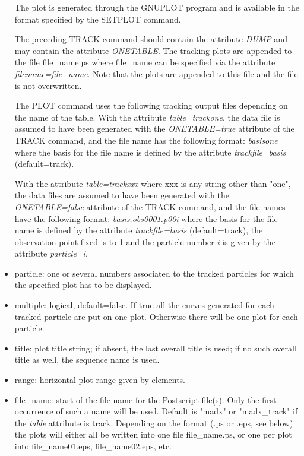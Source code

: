 \begin{itemize}
     The plot is generated through the GNUPLOT program and is available
     in the format specified by the SETPLOT command. 

     The preceding TRACK command should contain the attribute \textit{DUMP}
     and may contain the attribute \textit{ONETABLE}. The tracking plots
     are appended to the file file\_name.ps where file\_name can be
     specified via the attribute \textit{filename=file\_name}. Note that
     the plots are appended to this file and the file is not
     overwritten. 

     The PLOT command uses the following tracking output files depending on
     the name of the table.  
     With the attribute \textit{table=trackone}, the data file is assumed
     to have been generated with the \textit{ONETABLE=true} attribute of
     the TRACK command, and the file name has the following format: 
     \textit{basisone} where the basis for the file name is defined by the
     attribute \textit{trackfile=basis} (default=track).

     With the attribute \textit{table=trackxxx} where xxx is any string
     other than "one", the data files are assumed to have been generated
     with the \textit{ONETABLE=false} attribute of the TRACK command, and
     the file names have the following format: \textit{basis.obs0001.p00i}
     where the basis for the file name is defined by the attribute
     \textit{trackfile=basis} (default=track), the observation point fixed
     is to 1 and the particle number \textit{i} is given by the attribute
     \textit{particle=i}. 
 
   \item particle: one or several numbers associated to the tracked
     particles for which the specified plot has to be displayed.  

   \item multiple: logical, default=false. If true all the curves
     generated for each tracked particle are put on one plot. Otherwise
     there will be one plot for each particle.   

   \item title: plot title string; if absent, the last overall title is
     used; if no such overall title as well, the sequence name is used.   

   \item range: horizontal plot
     \href{../Introduction/ranges.html}{range} given by elements.  

   \item file\_name: start of the file name for the Postscript
     file(s). Only the first occurrence of such a name will be
     used. Default is "madx" or "madx\_track" if the \textit{table}
     attribute is track.  Depending on the format (.ps or .eps, see
     below) the plots will either all be written into one file
     file\_name.ps, or one per plot into file\_name01.eps,
     file\_name02.eps, etc.   


\end{itemize}
